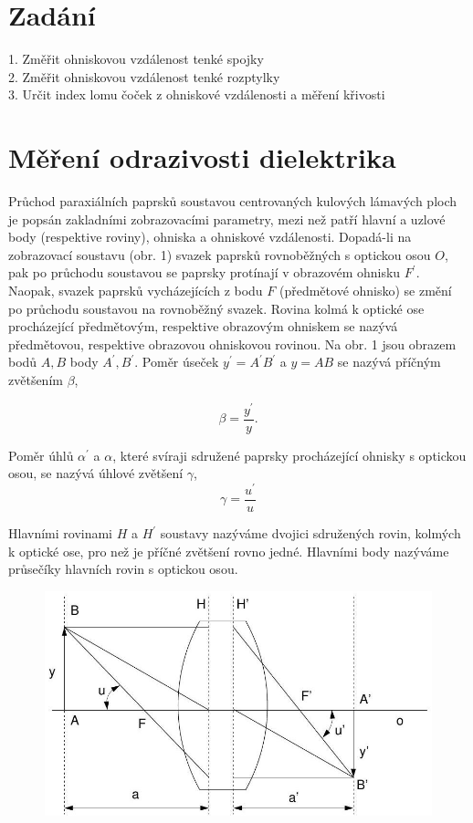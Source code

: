 \documentclass[czech,11pt,a4paper]{article}
\begin{document}
	\begin{multicols}{2}
		\section{Zadání}
		1. Změřit ohniskovou vzdálenost tenké spojky\\
		2. Změřit ohniskovou vzdálenost tenké rozptylky\\
		3. Určit index lomu čoček z ohniskové vzdálenosti a měření křivosti
		\section*{Měření odrazivosti dielektrika}
	Průchod paraxiálních paprsků soustavou centrovaných kulových lámavých ploch je popsán zakladními zobrazovacími parametry, mezi než patří hlavní a uzlové body (respektive roviny), ohniska a ohniskové vzdálenosti. Dopadá-li na zobrazovací soustavu (obr. 1) svazek paprsků rovnoběžných s optickou osou $O$, pak po průchodu soustavou se paprsky protínají v obrazovém ohnisku $F^{\prime}$. Naopak, svazek paprsků vycházejících z bodu $F$ (předmětové ohnisko) se změní po průchodu soustavou na rovnoběžný svazek. Rovina kolmá k optické ose procházející předmětovým, respektive obrazovým ohniskem se nazývá předmětovou, respektive obrazovou ohniskovou rovinou. Na obr. 1 jsou obrazem bodů $A, B$ body $A^{\prime}, B^{\prime}$. Poměr úseček $y^{\prime}=A^{\prime} B^{\prime}$ a $y=A B$ se nazývá příčným zvětšením $\beta$,
	
	\begin{equation}
		\beta=\frac{y^{\prime}}{y} .
	\end{equation}
	
	
	Poměr úhlů $\alpha^{\prime}$ a $\alpha$, které svíraji sdružené paprsky procházející ohnisky s optickou osou, se nazývá úhlové zvětšení $\gamma$,
	\begin{equation}
		\gamma=\frac{u^{\prime}}{u}
	\end{equation}
	
	
	Hlavními rovinami $H$ a $H^{\prime}$ soustavy nazýváme dvojici sdružených rovin, kolmých k optické ose, pro než je příčné zvětšení rovno jedné. Hlavními body nazýváme průsečíky hlavních rovin s optickou osou.
\begin{figure}[H]

		\includegraphics[max width=0.95\linewidth, center]{2024_12_03_2b013636ff75d184213cg-1}


\end{figure}
\end{multicols}
\end{document}
